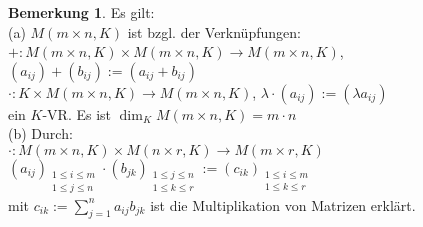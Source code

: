 \documentclass[10pt,a4paper,numbers=endperiod]{scrartcl}
\theoremstyle{definition}
\newtheorem{bem}[satz]{Bemerkung}
\begin{document}
\begin{bem}
	Es gilt:\\
	(a) $M(m \times n,K)$ ist bzgl. der Verknüpfungen:\\
	$+: M(m \times n,K) \times M(m \times n,K) \rightarrow M(m \times n,K)$, $(a_{ij})+(b_{ij}) := (a_{ij}+b_{ij})$\\
	$\cdot: K \times M(m \times n,K) \rightarrow M(m \times n,K)$, $\lambda \cdot(a_{ij}) := (\lambda a_{ij})$\\
	ein $K$-VR. Es ist $\dim_K M(m \times n,K) = m \cdot n$\\
	(b) Durch:\\
	$\cdot: M(m \times n,K) \times M(n \times r,K) \rightarrow M(m \times r,K)$\\
	$(a_{ij})_{\substack{1 \leq i \leq m\\ 1\leq j \leq n}} \cdot (b_{jk})_{\substack{1 \leq j \leq n\\ 1\leq k \leq r}} := (c_{ik})_{\substack{1 \leq i \leq m\\ 1\leq k \leq r}}$\\
	mit $c_{ik} := \sum_{j=1}^{n} a_{ij} b_{jk}$ ist die Multiplikation von Matrizen erklärt.
	

\end{bem}
\end{document}

